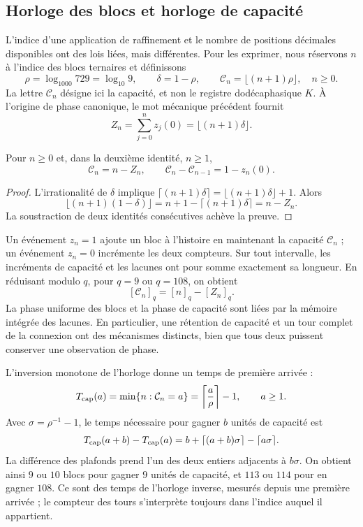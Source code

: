 \subsection{Horloge des blocs et horloge de capacité}
\label{x_reciprocidad:mono-ampl:relojes}

L'indice d'une application de raffinement et le nombre de positions
décimales disponibles ont des lois liées, mais différentes. Pour
les exprimer, nous réservons \(n\) à l'indice des blocs ternaires et définissons
\[
 \rho=\log_{1000}729=\log_{10}9,\qquad
 \delta=1-\rho,\qquad
 \mathcal C_n=\lfloor(n+1)\rho\rfloor,\quad n\geq0.
\]
La lettre \(\mathcal C_n\) désigne ici la capacité, et non le registre
dodécaphasique \(K\). À l'origine de phase canonique, le mot mécanique
précédent fournit
\[
 Z_n=\sum_{j=0}^{n}z_j(0)=\lfloor(n+1)\delta\rfloor.
\]

\begin{proposition}
\label{x_reciprocidad:mono-ampl:balance-capacidad}
Pour \(n\geq0\) et, dans la deuxième identité, \(n\geq1\),
\[
 \mathcal C_n=n-Z_n,\qquad
 \mathcal C_n-\mathcal C_{n-1}=1-z_n(0).
\]
\end{proposition}
\begin{proof}
L'irrationalité de \(\delta\) implique
\(\lceil(n+1)\delta\rceil=\lfloor(n+1)\delta\rfloor+1\).
Alors
\[
 \lfloor(n+1)(1-\delta)\rfloor
 =n+1-\lceil(n+1)\delta\rceil=n-Z_n.
\]
La soustraction de deux identités consécutives achève la preuve.
\end{proof}

Un événement \(z_n=1\) ajoute un bloc à l'histoire en maintenant la capacité
\(\mathcal C_n\) ; un événement \(z_n=0\) incrémente les deux compteurs. Sur
tout intervalle, les incréments de capacité et les lacunes ont pour somme
exactement sa longueur. En réduisant modulo \(q\), pour \(q=9\) ou
\(q=108\), on obtient
\[
 [\mathcal C_n]_q=[n]_q-[Z_n]_q.
\]
La phase uniforme des blocs et la phase de capacité sont liées par
la mémoire intégrée des lacunes. En particulier, une rétention de
capacité et un tour complet de la connexion ont des mécanismes
distincts, bien que tous deux puissent conserver une observation de phase.

L'inversion monotone de l'horloge donne un temps de première arrivée :
\[
 T_{\rm cap}(a)=\min\{n:\mathcal C_n=a\}
 =\left\lceil\frac a\rho\right\rceil-1,
 \qquad a\geq1.
\]
Avec \(\sigma=\rho^{-1}-1\), le temps nécessaire pour gagner \(b\) unités
de capacité est
\[
 T_{\rm cap}(a+b)-T_{\rm cap}(a)
 =b+\lceil(a+b)\sigma\rceil-\lceil a\sigma\rceil.
\]
La différence des plafonds prend l'un des deux entiers adjacents à
\(b\sigma\). On obtient ainsi \(9\) ou \(10\) blocs pour gagner
\(9\) unités de capacité, et \(113\) ou \(114\) pour en gagner \(108\).
Ce sont des temps de l'horloge inverse, mesurés depuis une première arrivée ; le
compteur des tours s'interprète toujours dans l'indice auquel il appartient.

